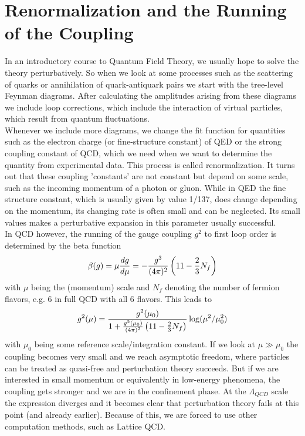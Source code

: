 \section{Renormalization and the Running of the Coupling}
In an introductory course to Quantum Field Theory, we usually hope to solve the theory perturbatively. So when we look at some processes such as the scattering of quarks or annihilation of quark-antiquark pairs we start with the tree-level Feynman diagrams. After calculating the amplitudes arising from these diagrams we include loop corrections, which include the interaction of virtual particles, which result from quantum fluctuations.\\
Whenever we include more diagrams, we change the fit function for quantities such as the electron charge (or fine-structure constant) of QED or the strong coupling constant of QCD, which we need when we want to determine the quantity from experimental data. This process is called renormalization. It turns out that these coupling 'constants' are not constant but depend on some scale, such as the incoming momentum of a photon or gluon. While in QED the fine structure constant, which is usually given by value 1/137, does change depending on the momentum, its changing rate is often small and can be neglected. Its small values makes a perturbative expansion in this parameter usually successful.\\ In QCD however, the running of the gauge coupling $g^2$ to first loop order is determined by the beta function
\begin{equation}
    \beta(g)=\mu\frac{dg}{d\mu}=-\frac {g^3}{(4\pi)^2}\left(11-\frac{2}{3}N_f\right)
\end{equation} 
with $\mu$ being the (momentum) scale and $N_f$ denoting the number of fermion flavors, e.g. 6 in full QCD with all 6 flavors. This leads to 
\begin{equation}
    g^2(\mu)=\frac{g^2(\mu_0)}{1+\frac{g^2(\mu_0)}{(4\pi)^2}\left(11-\frac{2}{3}N_f\right)}\log(\mu^2/\mu_0^2)
\end{equation}
with $\mu_0$ being some reference scale/integration constant. If we look at $\mu \gg\mu_0$ the coupling becomes very small and we reach asymptotic freedom, where particles can be treated as quasi-free and perturbation theory succeeds. But if we are interested in small momentum or equivalently in low-energy phenomena, the coupling gets stronger and we are in the confinement phase. At the $\Lambda_{QCD}$ scale the expression diverges and it becomes clear that perturbation theory fails at this point (and already earlier). Because of this, we are forced to use other computation methods, such as Lattice QCD\cite{peskin}.












